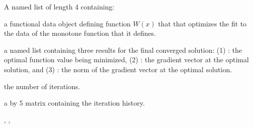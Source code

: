 \documentclass{article}
\begin{document}
\begin{Value}
A named list of length 4 containing:

\begin{ldescription}
\item[\code{Wfdobj}] a functional data object defining function $W(x)$ that that
optimizes the fit to the data of the monotone function that it
defines.

\item[\code{Flist}] a named list containing three results for the final converged
solution: (1) : the optimal function value being minimized,
(2) : the gradient vector at the optimal solution, and
(3) : the norm of the gradient vector at the optimal
solution.

\item[\code{iternum}] the number of iterations.

\item[\code{iterhist}] a \code{} by 5 matrix containing the iteration history.

\end{ldescription}
\end{Value}
\begin{SeeAlso}\relax
{},
,
\end{SeeAlso}
\end{document}
